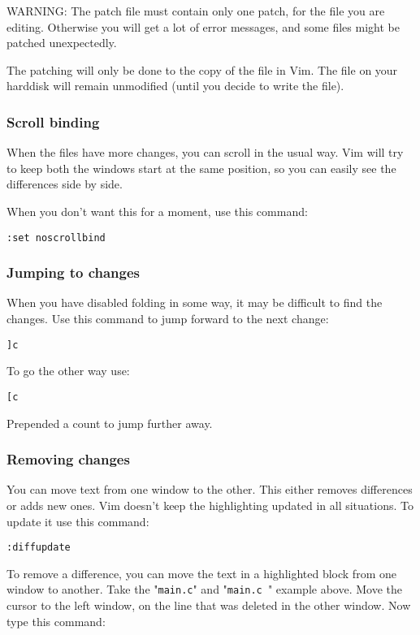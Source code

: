 WARNING: The patch file must contain only one patch, for the file you are editing.
Otherwise you will get a lot of error messages, and some files might be patched unexpectedly.

The patching will only be done to the copy of the file in Vim.
The file on your harddisk will remain unmodified (until you decide to write the file).

\subsubsection{Scroll binding}
When the files have more changes, you can scroll in the usual way.
Vim will try to keep both the windows start at the same position, so you can easily see the differences side by side.

When you don't want this for a moment, use this command:

 \begin{Verbatim}[samepage=true]
 :set noscrollbind
 \end{Verbatim}

\subsubsection{Jumping to changes}
When you have disabled folding in some way, it may be difficult to find the changes.
Use this command to jump forward to the next change:

 \begin{Verbatim}[samepage=true]
 ]c
 \end{Verbatim}

To go the other way use:

 \begin{Verbatim}[samepage=true]
 [c
 \end{Verbatim}

Prepended a count to jump further away.
\subsubsection{Removing changes}
You can move text from one window to the other.
This either removes differences or adds new ones.
Vim doesn't keep the highlighting updated in all situations.
To update it use this command:

 \begin{Verbatim}[samepage=true]
 :diffupdate
 \end{Verbatim}

To remove a difference, you can move the text in a highlighted block from one window to another.
Take the "\texttt{main.c}" and "\texttt{main.c~}" example above.
Move the cursor to the left window, on the line that was deleted in the other window.
Now type this command:

